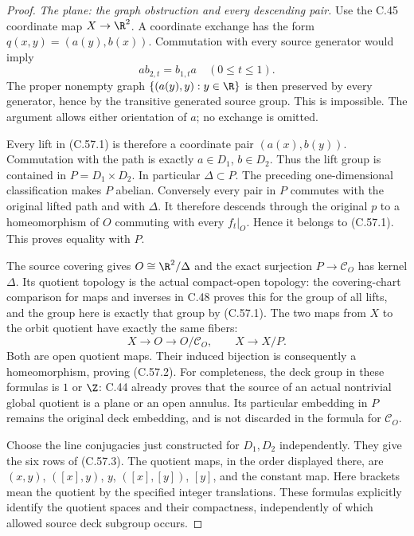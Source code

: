 \begin{proof}
\emph{The plane: the graph obstruction and every descending pair.}
Use the C.45 coordinate map $X\to\R^2$.
A coordinate exchange has the form
$q(x,y)=(a(y),b(x))$. Commutation with every
source generator would imply
\[
                   a b_{2,t}=b_{1,t}a
                                      \quad(0\leq t\leq1).
                                                               \tag{C.57.5}
\]
The proper nonempty graph
$\{(a(y),y):y\in\R\}$ is then preserved
by every generator, hence by the
transitive generated source group.
This is impossible. The argument allows
either orientation of $a$; no exchange
is omitted.

Every lift in (C.57.1) is therefore a
coordinate pair $(a(x),b(y))$.
Commutation with the path is exactly
$a\in D_1$, $b\in D_2$.
Thus the lift group is contained in
$P=D_1\times D_2$. In particular
$\Delta\subset P$.
The preceding one-dimensional
classification makes $P$ abelian.
Conversely every pair in $P$ commutes
with the original lifted path and
with $\Delta$. It therefore descends
through the original $p$ to a
homeomorphism of $O$ commuting with
every $f_t|_O$. Hence it belongs to
(C.57.1). This proves equality with $P$.

The source covering gives
$O\cong\R^2/\Delta$ and the exact
surjection $P\to\mathcal C_O$ has kernel
$\Delta$. Its quotient topology is
the actual compact-open topology:
the covering-chart comparison for
maps and inverses in C.48 proves
this for the group of all lifts,
and the group here is exactly that
group by (C.57.1).
The two maps from $X$ to the orbit
quotient have exactly the same fibers:
\[
      X\longrightarrow O\longrightarrow O/\mathcal C_O,
                   \qquad X\longrightarrow X/P.        \tag{C.57.6}
\]
Both are open quotient maps. Their
induced bijection is consequently a
homeomorphism, proving (C.57.2).
For completeness, the deck group
in these formulas is $1$ or $\Z$:
C.44 already proves that the source
of an actual nontrivial global quotient
is a plane or an open annulus.
Its particular embedding in $P$
remains the original deck embedding,
and is not discarded in the formula
for $\mathcal C_O$.

Choose the line conjugacies just
constructed for $D_1,D_2$ independently.
They give the six rows of (C.57.3).
The quotient maps, in the order
displayed there, are
$(x,y)$, $([x],y)$, $y$,
$([x],[y])$, $[y]$, and the constant
map. Here brackets mean the quotient
by the specified integer translations.
These formulas explicitly identify
the quotient spaces and their
compactness, independently of which
allowed source deck subgroup occurs.


\end{proof}
